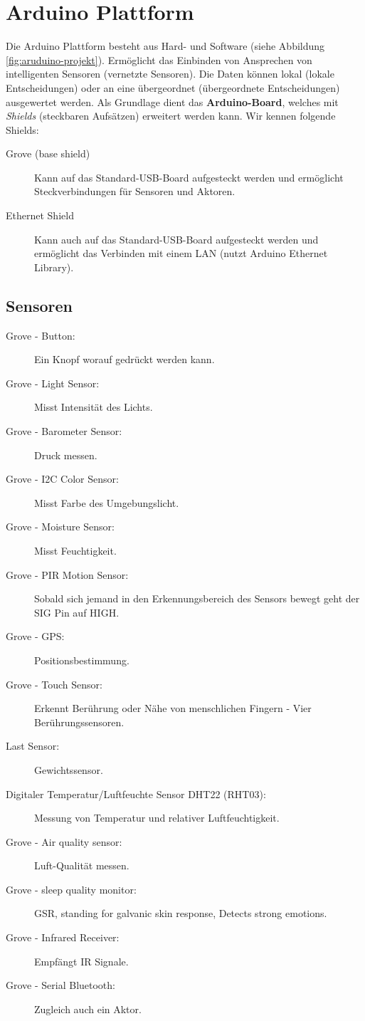 \section{Arduino Plattform}
Die Arduino Plattform besteht aus Hard- und Software (siehe Abbildung \ref{fig:aruduino-projekt}). Ermöglicht das Einbinden von Ansprechen von intelligenten Sensoren (vernetzte Sensoren). Die Daten können lokal (lokale Entscheidungen) oder an eine übergeordnet (übergeordnete Entscheidungen) ausgewertet werden. Als Grundlage dient das \textbf{Arduino-Board}, welches mit \emph{Shields} (steckbaren Aufsätzen) erweitert werden kann. Wir kennen folgende Shields:
\begin{description}
	\item[Grove (base shield)] Kann auf das Standard-USB-Board aufgesteckt werden und ermöglicht Steckverbindungen für Sensoren und Aktoren.
	\item[Ethernet Shield] Kann auch auf das Standard-USB-Board aufgesteckt werden und ermöglicht das Verbinden mit einem LAN (nutzt Arduino Ethernet Library).
\end{description}

\subsection{Sensoren}
\begin{description}
	\item[Grove - Button:] Ein Knopf worauf gedrückt werden kann.
	\item[Grove - Light Sensor:] Misst Intensität des Lichts. 
	\item[Grove - Barometer Sensor:] Druck messen.
	\item[Grove - I2C Color Sensor:] Misst Farbe des Umgebungslicht.
	\item[Grove - Moisture Sensor:] Misst Feuchtigkeit.
	\item[Grove - PIR Motion Sensor:] Sobald sich jemand in den Erkennungsbereich des Sensors bewegt geht der SIG Pin auf HIGH.
	\item[Grove - GPS:] Positionsbestimmung.
	\item[Grove - Touch Sensor:] Erkennt Berührung oder Nähe von menschlichen Fingern - Vier Berührungssensoren.
	\item[Last Sensor:] Gewichtssensor.
	\item[Digitaler Temperatur/Luftfeuchte Sensor DHT22 (RHT03):] Messung von Temperatur
	und relativer Luftfeuchtigkeit.
	\item[Grove - Air quality sensor:] Luft-Qualität messen.
	\item[Grove - sleep quality monitor:] GSR, standing for galvanic skin response, Detects strong emotions.
	\item[Grove - Infrared Receiver:] Empfängt IR Signale.
	\item[Grove - Serial Bluetooth:] Zugleich auch ein Aktor.
\end{description}

